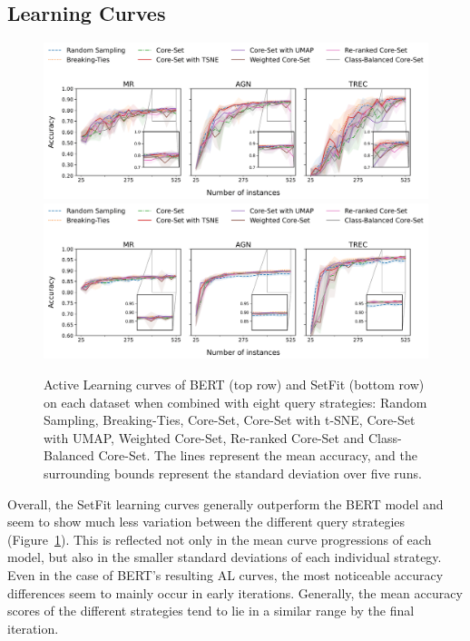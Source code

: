 \documentclass[english,bachelor,ul]{webisthesis} %
\begin{document}
\subsection*{Learning Curves}


\begin{figure}[t]
    \centering
    \includegraphics[width=1\textwidth,trim={0 1.1cm 0 0},clip]{img/bert-plots-1.png}
    \includegraphics[width=1\textwidth,trim={0 0 0 4.83cm},clip]{img/setfit-plots-1.png}
    \caption{Active Learning curves of BERT (top row) and SetFit (bottom row) on each dataset when combined with eight query strategies: Random Sampling, Breaking-Ties, Core-Set, Core-Set with t-SNE, Core-Set with UMAP, Weighted Core-Set, Re-ranked Core-Set and Class-Balanced Core-Set. The lines represent the mean accuracy, and the surrounding bounds represent the standard deviation over five runs.}
    \label{fig:learning-curves}
\end{figure}

Overall, the SetFit learning curves generally outperform the BERT model and seem to show much less variation between the different query strategies (Figure~\ref{fig:learning-curves}). This is reflected not only in the mean curve progressions of each model, but also in the smaller standard deviations of each individual strategy. Even in the case of BERT's resulting AL curves, the most noticeable accuracy differences seem to mainly occur in early iterations. Generally, the mean accuracy scores of the different strategies tend to lie in a similar range by the final iteration. 
\end{document}
